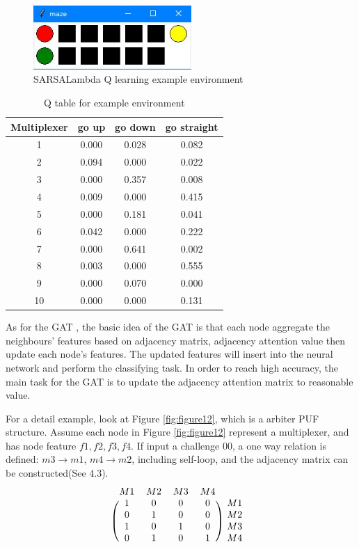 \begin{figure}[htp]
    \centering
    \includegraphics[width=6cm]{figures/figure11.jpg}
    \caption{SARSALambda Q learning example environment}
    \label{fig:figure11}
    \end{figure}

\begin{table}[ht]
    \center
    \begin{tabular}{c|ccc}
    Multiplexer & go up & go down & go straight\\
    \hline
    1 & 0.000 & 0.028 & 0.082\\
    2 & 0.094 & 0.000 & 0.022\\
    3 & 0.000 & 0.357 & 0.008\\
    4 & 0.009 & 0.000 & 0.415\\
    5 & 0.000 & 0.181 & 0.041\\
    6 & 0.042 & 0.000 & 0.222\\
    7 & 0.000 & 0.641 & 0.002\\
    8 & 0.003 & 0.000 & 0.555\\
    9 & 0.000 & 0.070 & 0.000\\
    10 & 0.000 & 0.000 & 0.131\\
    \end{tabular}
    \caption{Q table for example environment}
    \label{tab:table1}
    \end{table}

As for the GAT \cite{Reference10}, the basic idea of the GAT is that each node aggregate the neighbours’ features based on adjacency matrix, adjacency attention value then update each node's features. 
The updated features will insert into the neural network and perform the classifying task. In order to reach high accuracy, the main task for the GAT is to update the adjacency attention matrix to
reasonable value.

For a detail example, look at Figure \ref{fig:figure12}, which is a arbiter PUF structure. Assume each node in Figure \ref{fig:figure12} represent a multiplexer, and has node feature $f1,f2,f3,f4$. If input a 
challenge 00, a one way relation is defined: 
$m3 \rightarrow m1$, $m4 \rightarrow m2$, including self-loop, and the adjacency matrix can be constructed(See 4.3). 
\begin{equation}
    \begin{blockarray}{ccccc}
    M1 & M2 & M3 & M4\\
    \begin{block}{(cccc)c}
        1 & 0 & 0 & 0 & M1\\
        0 & 1 & 0 & 0 & M2\\
        1 & 0 & 1 & 0 & M3\\
        0 & 1 & 0 & 1 & M4\\
    \end{block}
    \end{blockarray}
    \label{matrix}
\end{equation}

